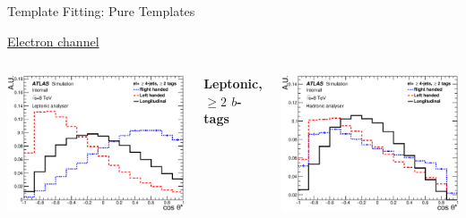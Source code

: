 \documentclass{beamer}
\begin{document}
{\begin{frame}{Template Fitting: Pure Templates}
{\begin{itemize}
      \end{itemize}
      \centering\small\underline{Electron channel}
      \vspace{-20pt}
      \begin{columns}
        \begin{center}\includegraphics[width=1.16\textwidth]{../chapters/whel/figures/templatePlots/Leptonic/Signal_Templates_2incl_el_lep}\end{center}\vspace{-15pt}\centering\tiny
        \textbf{Leptonic, $\geq2$ $b$-tags}
        \begin{center}\includegraphics[width=1.16\textwidth]{../chapters/whel/figures/templatePlots/Hadronic/Signal_Templates_2incl_el_had}\end{center}\vspace{-15pt}\centering\tiny

\end{columns}}
\end{frame}}
\end{document}
